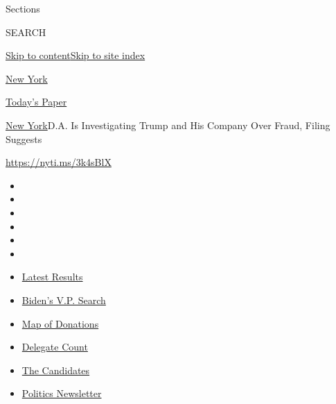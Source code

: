Sections

SEARCH

\protect\hyperlink{site-content}{Skip to
content}\protect\hyperlink{site-index}{Skip to site index}

\href{https://www.nytimes.com/section/nyregion}{New York}

\href{https://myaccount.nytimes.com/auth/login?response_type=cookie\&client_id=vi}{}

\href{https://www.nytimes.com/section/todayspaper}{Today's Paper}

\href{/section/nyregion}{New York}\textbar{}D.A. Is Investigating Trump
and His Company Over Fraud, Filing Suggests

\url{https://nyti.ms/3k4sBlX}

\begin{itemize}
\item
\item
\item
\item
\item
\item
\end{itemize}

\begin{itemize}
\item
  \href{https://www.nytimes.com/interactive/2020/08/04/us/elections/results-arizona-kansas-michigan-missouri-primaries.html?action=click\&pgtype=Article\&state=default\&region=TOP_BANNER\&context=storylines_menu}{Latest
  Results}
\item
  \href{https://www.nytimes.com/article/biden-vice-president-2020.html?action=click\&pgtype=Article\&state=default\&region=TOP_BANNER\&context=storylines_menu}{Biden's
  V.P. Search}
\item
  \href{https://www.nytimes.com/interactive/2020/07/24/us/politics/trump-biden-campaign-donors.html?action=click\&pgtype=Article\&state=default\&region=TOP_BANNER\&context=storylines_menu}{Map
  of Donations}
\item
  \href{https://www.nytimes.com/interactive/2020/us/elections/delegate-count-primary-results.html?action=click\&pgtype=Article\&state=default\&region=TOP_BANNER\&context=storylines_menu}{Delegate
  Count}
\item
  \href{https://www.nytimes.com/interactive/2019/us/politics/2020-presidential-candidates.html?action=click\&pgtype=Article\&state=default\&region=TOP_BANNER\&context=storylines_menu}{The
  Candidates}
\item
  \href{https://www.nytimes.com/newsletters/politics?action=click\&pgtype=Article\&state=default\&region=TOP_BANNER\&context=storylines_menu}{Politics
  Newsletter}
\end{itemize}

